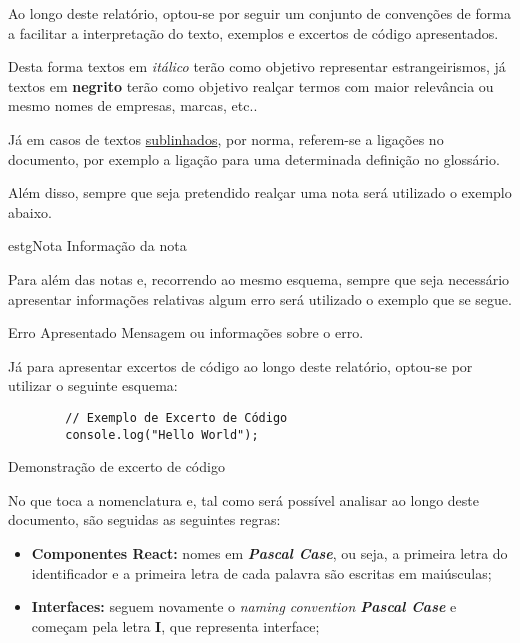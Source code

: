 
Ao longo deste relatório, optou-se por seguir um conjunto de convenções de forma a facilitar a interpretação do texto, exemplos e excertos de código apresentados.

Desta forma textos em \textit{itálico} terão como objetivo representar estrangeirismos, já textos em \textbf{negrito} terão como objetivo realçar termos com maior relevância ou mesmo nomes de empresas, marcas, etc..

Já em casos de textos \underline{sublinhados}, por norma, referem-se a ligações no documento, por exemplo a ligação para uma determinada definição no glossário.

Além disso, sempre que seja pretendido realçar uma nota será utilizado o exemplo abaixo.

\vspace{0.01cm}

\begin{mybox}{estg}{Nota}
	Informação da nota
\end{mybox}

\vspace{0.1cm}

Para além das notas e, recorrendo ao mesmo esquema, sempre que seja necessário apresentar informações relativas algum erro será utilizado o exemplo que se segue.

\vspace{0.01cm}

\begin{errorbox}{Erro Apresentado}
Mensagem ou informações sobre o erro.
\end{errorbox}

\vspace{0.1cm}

Já para apresentar excertos de código ao longo deste relatório, optou-se por utilizar o seguinte esquema:

\vspace{0.01cm}

\begin{longlisting}
	\begin{verbatim}
		// Exemplo de Excerto de Código
		console.log("Hello World");
	\end{verbatim}
	\caption{Demonstração de excerto de código}
\end{longlisting}

\vspace{0.1cm}

No que toca a nomenclatura e, tal como será possível analisar ao longo deste documento, são seguidas as seguintes regras:

\begin{itemize}
	\item \textbf{Componentes React:} nomes em \textit{\textbf{Pascal Case}}, ou seja, a primeira letra do identificador e a primeira letra de cada palavra são escritas em maiúsculas;
	\item \textbf{Interfaces:} seguem novamente o \textit{naming convention \textbf{Pascal Case}} e começam pela letra \textbf{I}, que representa interface;
\end{itemize}